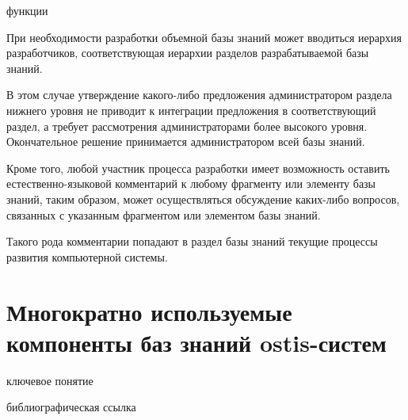 \begin{SCn}
\begin{scnrelfromset}{функции}
\end{scnrelfromset}

\end{SCn}

При необходимости разработки объемной базы знаний может вводиться иерархия разработчиков, соответствующая иерархии разделов разрабатываемой базы знаний.

В этом случае утверждение какого-либо предложения администратором раздела нижнего уровня не приводит к интеграции предложения в соответствующий раздел, а требует рассмотрения администраторами более высокого уровня. Окончательное решение принимается администратором всей базы знаний.

Кроме того, любой участник процесса разработки имеет возможность оставить естественно-языковой комментарий к любому фрагменту или элементу базы знаний, таким образом, может осуществляться обсуждение каких-либо вопросов, связанных с указанным фрагментом или элементом базы знаний. 

Такого рода комментарии попадают в раздел базы знаний текущие процессы развития компьютерной системы.

\section{Многократно используемые компоненты баз знаний ostis-систем}
\label{sc_kb_design_components}

\begin{SCn}
	\begin{scnrelfromlist}{ключевое понятие}
	\end{scnrelfromlist}
\end{SCn}

\begin{SCn}
	\begin{scnrelfromlist}{библиографическая ссылка}
	\end{scnrelfromlist}
\end{SCn}


